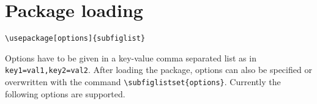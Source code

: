\documentclass[version=3.12,american]{scrartcl}
\title\customtitle
\author\customauthor
\date{March 22, 2015}
\begin{document}
\maketitle

\tableofcontents

\section{Package loading}

\verb|\usepackage[options]{subfiglist}|

Options have to be given in a key-value comma separated list as in \texttt{key1=val1,key2=val2}. After loading the package, options can also be specified or overwritten with the command \verb|\subfiglistset{options}|. Currently the following options are supported.
\end{document}
